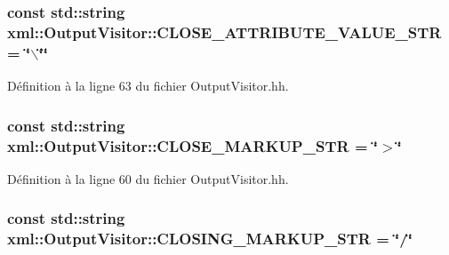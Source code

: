 \hypertarget{classxml_1_1_output_visitor_af3b7b1a653908df91dc19195b3bdb29b}{
\subsubsection[{CLOSE\_\-ATTRIBUTE\_\-VALUE\_\-STR}]{\setlength{\rightskip}{0pt plus 5cm}const std::string {\bf xml::OutputVisitor::CLOSE\_\-ATTRIBUTE\_\-VALUE\_\-STR} = \char`\"{}$\backslash$\char`\"{}\char`\"{}}}
\label{classxml_1_1_output_visitor_af3b7b1a653908df91dc19195b3bdb29b}


Définition à la ligne 63 du fichier OutputVisitor.hh.

\hypertarget{classxml_1_1_output_visitor_aef349142e7de8a309ee5dd048cc5b51f}{
\subsubsection[{CLOSE\_\-MARKUP\_\-STR}]{\setlength{\rightskip}{0pt plus 5cm}const std::string {\bf xml::OutputVisitor::CLOSE\_\-MARKUP\_\-STR} = \char`\"{}$>$\char`\"{}}}
\label{classxml_1_1_output_visitor_aef349142e7de8a309ee5dd048cc5b51f}


Définition à la ligne 60 du fichier OutputVisitor.hh.

\hypertarget{classxml_1_1_output_visitor_af06f2eb91d0a40d0d090aeb0bdeb9c9f}{
\subsubsection[{CLOSING\_\-MARKUP\_\-STR}]{\setlength{\rightskip}{0pt plus 5cm}const std::string {\bf xml::OutputVisitor::CLOSING\_\-MARKUP\_\-STR} = \char`\"{}/\char`\"{}}}
\label{classxml_1_1_output_visitor_af06f2eb91d0a40d0d090aeb0bdeb9c9f}


